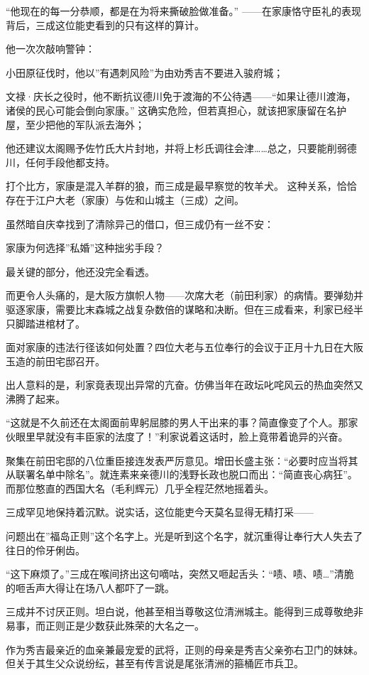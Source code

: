 \documentclass[
]{article}
\begin{document}
``他现在的每一分恭顺，都是在为将来撕破脸做准备。'' ------在家康恪守臣礼的表现背后，三成这位能吏看到的只有这样的算计。

他一次次敲响警钟：

小田原征伐时，他以''有遇刺风险''为由劝秀吉不要进入骏府城；

文禄·庆长之役时，他不断抗议德川免于渡海的不公待遇------``如果让德川渡海，诸侯的民心可能会倒向家康。'' 这确实危险，但若真担心，就该把家康留在名护屋，至少把他的军队派去海外；

他还建议太阁赐予佐竹氏大片封地，并将上杉氏调往会津\ldots\ldots 总之，只要能削弱德川，任何手段他都支持。

打个比方，家康是混入羊群的狼，而三成是最早察觉的牧羊犬。 这种关系，恰恰存在于江户大老（家康）与佐和山城主（三成）之间。

虽然暗自庆幸找到了清除异己的借口，但三成仍有一丝不安：

家康为何选择''私婚''这种拙劣手段？

最关键的部分，他还没完全看透。

而更令人头痛的，是大阪方旗帜人物------次席大老（前田利家）的病情。要弹劾并驱逐家康，需要比末森城之战复杂数倍的谋略和决断。但在三成看来，利家已经半只脚踏进棺材了。

面对家康的违法行径该如何处置？四位大老与五位奉行的会议于正月十九日在大阪玉造的前田宅邸召开。

出人意料的是，利家竟表现出异常的亢奋。仿佛当年在政坛叱咤风云的热血突然又沸腾了起来。

``这就是不久前还在太阁面前卑躬屈膝的男人干出来的事？简直像变了个人。那家伙眼里早就没有丰臣家的法度了！''利家说着这话时，脸上竟带着诡异的兴奋。

聚集在前田宅邸的八位重臣接连发表严厉意见。增田长盛主张：``必要时应当将其从联署名单中除名''。就连素来亲德川的浅野长政也脱口而出：``简直丧心病狂''。而那位憨直的西国大名（毛利辉元）几乎全程茫然地摇着头。

三成罕见地保持着沉默。说实话，这位能吏今天莫名显得无精打采------

问题出在''福岛正则''这个名字上。光是听到这个名字，就沉重得让奉行大人失去了往日的伶牙俐齿。

``这下麻烦了。''三成在喉间挤出这句嘀咕，突然又咂起舌头：``啧、啧、啧\ldots{}''清脆的咂舌声大得让在场八人都吓了一跳。

三成并不讨厌正则。坦白说，他甚至相当尊敬这位清洲城主。能得到三成尊敬绝非易事，而正则正是少数获此殊荣的大名之一。

作为秀吉最亲近的血亲兼最宠爱的武将，正则的母亲是秀吉父亲弥右卫门的妹妹。但关于其生父众说纷纭，甚至有传言说是尾张清洲的箍桶匠市兵卫。
\end{document}
